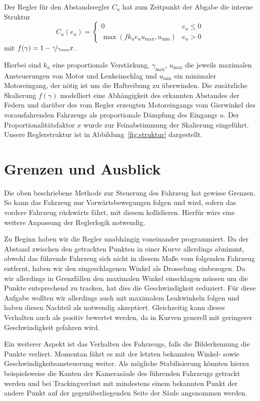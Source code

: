 \documentclass[10pt]{article}
\begin{document}
    Der Regler für den Abstandsregler $C_{u}$ hat zum Zeitpunkt der Abgabe die interne Struktur \[
    C_{u}(e_{u}) = \begin{cases} 0 & e_{u} \leq 0 \\
    \max (fk_{u}e_{u}u_{\max},u_{\min}) &  e_{u} > 0
    \end{cases}
    \]
    mit $f(\gamma) = 1 - \nicefrac{\gamma}{\gamma_{\max}}x$.

    Hierbei sind $k_{u}$ eine proportionale Verstärkung, $\gamma_{\max}$, $u_{\max}$ die jeweils maximalen Ansteuerungen von Motor und Lenkeinschlag und $u_{\min}$ ein minimaler Motoreingang, der nötig ist um die Haftreibung zu überwinden. 
    Die zusätzliche Skalierung $f(\gamma)$ modelliert eine Abhängigkeit des erkannten Abstandes der Federn und darüber des vom Regler erzeugten Motoreingangs vom Gierwinkel des vorausfahrenden Fahrzeugs als proportionale Dämpfung des Eingangs $u$. 
    Der Proportionalitätsfaktor $x$ wurde zur Feinabstimmung der Skalierung eingeführt.
    Unsere Reglerstruktur ist in Abbildung~\ref{fig:struktur} dargestellt.


\section{Grenzen und Ausblick}\label{sec:Ausblick}
    Die oben beschriebene Methode zur Steuerung des Fahrzeug hat gewisse Grenzen.
    So kann das Fahrzeug nur Vorwärtsbewegungen folgen und wird, sofern das vordere Fahrzeug rückwärts fährt, mit diesem kollidieren.
    Hierfür wäre eine weitere Anpassung der Reglerlogik notwendig.

    Zu Beginn haben wir die Regler unabhängig voneinander programmiert.
    Da der Abstand zwischen den getrackten Punkten in einer Kurve allerdings abnimmt, obwohl das führende Fahrzeug sich nicht in diesem Maße vom folgenden Fahrzeug entfernt, haben wir den eingeschlagenen Winkel als Drosselung einbezogen.
    Da wir allerdings in Grenzfällen den maximalen Winkel einschlagen müssen um die Punkte entsprechend zu tracken, hat dies die Geschwindigkeit reduziert.
    Für diese Aufgabe wollten wir allerdings auch mit maximalem Lenkwinkeln folgen und haben diesen Nachteil als notwendig akzeptiert.
    Gleichzeitig kann dieses Verhalten auch als positiv bewertet werden, da in Kurven generell mit geringerer Geschwindigkeit gefahren wird.

    Ein weiterer Aspekt ist das Verhalten des Fahrzeugs, falls die Bilderkennung die Punkte verliert.
    Momentan fährt es mit der letzten bekannten Winkel- sowie Geschwindigkeitsansteuerung weiter.
    Als mögliche Stabilisierung könnten hierzu beispielsweise die Kanten der Kamerasäule des führenden Fahrzeugs getrackt werden und bei Trackingverlust mit mindestens einem bekannten Punkt der andere Punkt auf der gegenüberliegenden Seite der Säule angenommen werden.
\end{document}
